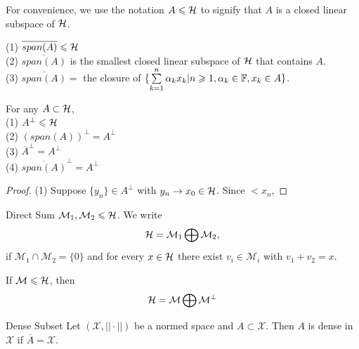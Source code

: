For convenience, we use the notation $A\leqslant \mathcal{H}$ to signify  that $A$ is a closed linear subspace of $\mathcal{H}$.

\begin{proposition}{}{}
    (1) $\overline{span(A)}\leqslant \mathcal{H}$\\
    (2) $\overline{span(A)}$ is the smallest closed linear subspace of $\mathcal{H}$ that contains $A$.\\
    (3) $\overline{span(A)}=$ the closure of $\{\sum\limits_{k=1}^{n}\alpha_kx_k|n\geqslant 1,\alpha_k\in \mathbb{F},x_k\in A\}$.
\end{proposition}

\begin{proposition}{}{}
    For any $A\subset \mathcal{H}$,\\
    (1) $A^{\perp}\leqslant\mathcal{H}$\\
    (2) $(span(A))^{\perp}=A^{\perp}$\\
    (3) $\overline{A}^{\perp} = A^{\perp}$\\    
    (4) $\overline{span(A)}^{\perp}=A^{\perp}$\\
\end{proposition}

\begin{proof}
    (1) Suppose $\{y_n\}\in A^{\perp}$ with $y_n\rightarrow x_0\in \mathcal{H}$. Since $<x_n$, 
\end{proof}

\begin{definition}{Direct Sum}{}
    $\mathcal{M}_1,\mathcal{M}_2\leqslant \mathcal{H}$. We write 
    \begin{align*}
        \mathcal{H}=\mathcal{M}_1 \bigoplus \mathcal{M}_2, 
    \end{align*} 
    if $\mathcal{M}_1\cap \mathcal{M}_2=\{0\}$ and for every $x\in\mathcal{H}$ there exist $v_i\in \mathcal{M}_i$ with $v_1+v_2=x$.
\end{definition}

\begin{proposition}{}{}
If $\mathcal{M}\leqslant \mathcal{H}$, then
    \begin{align*}
        \mathcal{H} = \mathcal{M}\bigoplus \mathcal{M}^{\perp}
    \end{align*}
\end{proposition}

\begin{definition}{Dense Subset}{}
    Let $(\mathcal{X},||\cdot||)$ be a normed space and $A\subset \mathcal{X}$. Then $A$ is dense in $\mathcal{X}$ if $\overline{A}=\mathcal{X}$. 
\end{definition}

